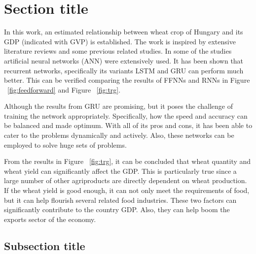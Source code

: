 \section{Section title}

In this work, an estimated relationship between wheat crop of Hungary and its GDP (indicated with GVP) is established. The work is inspired by extensive literature reviews and some previous related studies. In some of the studies artificial neural networks (ANN) were extensively used. It has been shown that recurrent networks, specifically its variants LSTM and GRU can perform much better. This can be verified comparing the results of FFNNs and RNNs in Figure ~\ref{fig:feedforward} and Figure ~\ref{fig:trg}. 

Although the results from GRU are promising, but it poses the challenge of training the network appropriately. Specifically, how the speed and accuracy can be balanced and made optimum. With all of its pros and cons, it has been able to cater to the problems dynamically and actively. Also, these networks can be employed to solve huge sets of problems. 

From the results in Figure ~\ref{fig:trg}, it can be concluded that wheat quantity and wheat yield can significantly affect the GDP. This is particularly true since a large number of other agriproducts are directly dependent on wheat production. If the wheat yield is good enough, it can not only meet the requirements of food, but it can help flourish several related food industries. These two factors can significantly contribute to the country GDP. Also, they can help boom the exports sector of the economy. 
\subsection{Subsection title}
